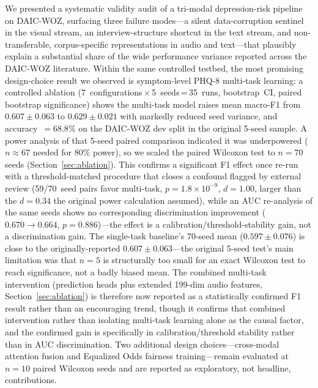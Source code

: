 \documentclass[journal]{IEEEtran}
\begin{document}
We presented a systematic validity audit of a tri-modal depression-risk
pipeline on DAIC-WOZ, surfacing three failure modes---a silent
data-corruption sentinel in the visual stream, an interview-structure
shortcut in the text stream, and non-transferable, corpus-specific
representations in audio and text---that plausibly explain a
substantial share of the wide performance variance reported across
the DAIC-WOZ literature. Within the same controlled testbed, the most
promising design-choice result we observed is symptom-level PHQ-8
multi-task learning: a controlled ablation
(7~configurations\,$\times$\,5~seeds\,=\,35~runs, bootstrap~CI,
paired bootstrap significance) shows the multi-task model raises
mean macro-F1 from $0.607\pm0.063$ to $0.629\pm0.021$ with markedly
reduced seed variance, and accuracy~$=68.8\%$ on the DAIC-WOZ dev
split in the original 5-seed sample. A power analysis of that 5-seed
paired comparison indicated it was underpowered
($n{\approx}67$ needed for 80\% power), so we scaled the paired
Wilcoxon test to $n{=}70$ seeds (Section~\ref{sec:ablation}). This
confirms a significant F1 effect once re-run with a threshold-matched
procedure that closes a confound flagged by external review (59/70~seed
pairs favor multi-task, $p{=}1.8{\times}10^{-9}$, $d{=}1.00$, larger
than the $d{=}0.34$ the original power calculation assumed), while an
AUC re-analysis of the same seeds shows no corresponding
discrimination improvement ($0.670\to0.664$, $p{=}0.886$)---the
effect is a calibration/threshold-stability gain, not a
discrimination gain. The single-task baseline's 70-seed mean
($0.597\pm0.076$) is close to the originally-reported
$0.607\pm0.063$---the original 5-seed test's main limitation was
that $n{=}5$ is structurally too small for an exact Wilcoxon test to
reach significance, not a badly biased mean.
The combined multi-task intervention (prediction heads plus extended
199-dim audio features, Section~\ref{sec:ablation}) is therefore now
reported as a statistically confirmed F1 result rather than an
encouraging trend, though it confirms that combined intervention
rather than isolating multi-task learning alone as the causal factor,
and the confirmed gain is specifically in calibration/threshold
stability rather than in AUC discrimination.
Two additional design choices---cross-modal
attention fusion and Equalized Odds fairness training---remain
evaluated at $n{=}10$ paired Wilcoxon seeds and are reported as
exploratory, not headline, contributions.
\end{document}
